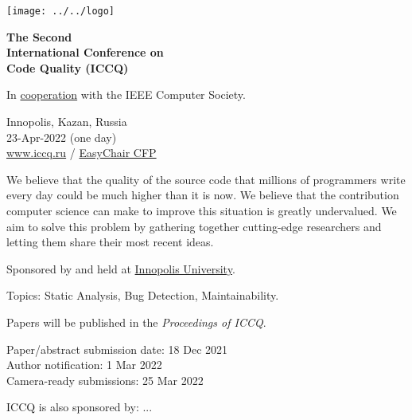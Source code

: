 \documentclass[12pt,oneside]{article}
\begin{document}
\selectfont
\raggedbottom
\raggedright
\setlength{\topskip}{6pt}
\setlength{\parindent}{0pt} %
\setlength{\parskip}{6pt} %

\begin{wraptable}{r}{1.2in}%
  \raggedleft%
  \texttt{[image: ../../logo]}
\end{wraptable}

\textcolor{xred}{\bfseries
{\large The Second} \\
{\Large International Conference on\\[3pt]
Code Quality (ICCQ)}}

In
\href{https://conferences.ieee.org/conferences_events/conferences/conferencedetails/51190}{cooperation}
with the IEEE Computer Society.

\vspace{6pt}

Innopolis, Kazan, Russia \\
23-Apr-2022 (one day) \\
\href{https://www.iccq.ru}{www.iccq.ru} / \href{https://easychair.org/cfp/ICCQ22}{EasyChair CFP}\\

\vspace{12pt}

\newcommand\person[2]{
  \begin{minipage}[t]{0.22\textwidth}\raggedright%
  \texttt{[image: ../../images/\#1]} \\
  {\small #2}%
  \end{minipage}
}

\vspace{6pt}

We believe that the quality of the source code that millions of programmers
write every day could be much higher than it is now. We believe that the
contribution computer science can make to improve this situation is greatly
undervalued. We aim to solve this problem by gathering
together cutting-edge researchers and letting them share their most recent ideas.

Sponsored by and held at \href{https://innopolis.university/en/}{Innopolis University}.

Topics: Static Analysis, Bug Detection, Maintainability.

Papers will be published in the \textit{Proceedings of ICCQ}.

\vspace{6pt}

Paper/abstract submission date: 18 Dec 2021 \\
Author notification: 1 Mar 2022 \\
Camera-ready submissions: 25 Mar 2022

\vspace{6pt}

\begin{adjustwidth}{0pt}{1in}
ICCQ is also sponsored by: ...
\end{adjustwidth}
\end{document}
